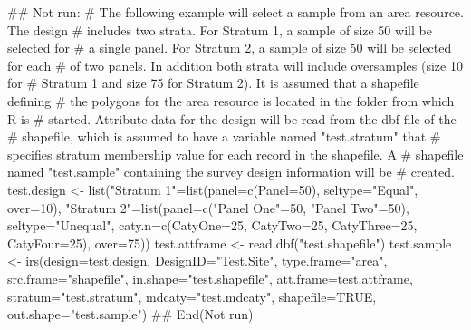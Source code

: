 \begin{Examples}
\begin{ExampleCode}
## Not run: 
# The following example will select a sample from an area resource.  The design
# includes two strata.  For Stratum 1, a sample of size 50 will be selected for
# a single panel.  For Stratum 2, a sample of size 50 will be selected for each
# of two panels.  In addition both strata will include oversamples (size 10 for
# Stratum 1 and size 75 for Stratum 2).  It is assumed that a shapefile defining
# the polygons for the area resource is located in the folder from which R is
# started.  Attribute data for the design will be read from the dbf file of the
# shapefile, which is assumed to have a variable named "test.stratum" that
# specifies stratum membership value for each record in the shapefile. A
# shapefile named "test.sample" containing the survey design information will be
# created.
test.design <- list("Stratum 1"=list(panel=c(Panel=50), seltype="Equal",
   over=10), "Stratum 2"=list(panel=c("Panel One"=50, "Panel Two"=50),
   seltype="Unequal", caty.n=c(CatyOne=25, CatyTwo=25, CatyThree=25,
   CatyFour=25), over=75))
test.attframe <- read.dbf("test.shapefile")
test.sample <- irs(design=test.design, DesignID="Test.Site", type.frame="area",
   src.frame="shapefile", in.shape="test.shapefile", att.frame=test.attframe,
   stratum="test.stratum", mdcaty="test.mdcaty", shapefile=TRUE,
   out.shape="test.sample")
## End(Not run)
\end{ExampleCode}
\end{Examples}

